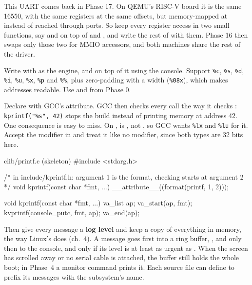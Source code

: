 \documentclass[11pt,a4paper]{article}
\begin{document}
\begin{tipbox}
This UART comes back in Phase 17. On QEMU's RISC-V  board it is the same 16550, with the same registers at
the same offsets, but memory-mapped at  instead of reached through ports. So keep every register
access in two small functions, say  and  on top of  and
, and write the rest of  with them. Phase 16 then swaps only those two for MMIO accessors,
and both machines share the rest of the driver.
\end{tipbox}

Write  with  as the engine, and
 on top of it using the console. Support \texttt{\%c}, \texttt{\%s}, \texttt{\%d}, \texttt{\%i}, \texttt{\%u},
\texttt{\%x}, \texttt{\%p} and \texttt{\%\%}, plus zero-padding with a width (\texttt{\%08x}), which makes addresses readable. Use
 and  from Phase 0.

Declare  with GCC's  attribute. GCC then checks every call the way it checks
: \texttt{kprintf("\%s", 42)} stops the build instead of printing memory at address 42. One consequence
is easy to miss. On ,  is , not , so GCC wants
\texttt{\%lx} and \texttt{\%lu} for it. Accept the  modifier in  and treat it like no modifier,
since both types are 32 bits here.

\begin{lst}{c}{lib/printf.c (skeleton)}
#include <stdarg.h>

/* in include/kprintf.h: argument 1 is the format, checking starts at argument 2 */
void kprintf(const char *fmt, ...) __attribute__((format(printf, 1, 2)));

void kprintf(const char *fmt, ...)
{
    va_list ap;
    va_start(ap, fmt);
    kvprintf(console_putc, fmt, ap);
    va_end(ap);
}
\end{lst}

Then give every message a \textbf{log level} and keep a copy of everything in memory, the way Linux's  does
(\LKP ch.~4). A message goes first into a ring buffer, , and only then to the console, and only if its
level is at least as urgent as . When the screen has scrolled away or no serial cable is
attached, the buffer still holds the whole boot; in Phase~4 a  monitor command prints it. Each source file
can define  to prefix its messages with the subsystem's name.
\end{document}
